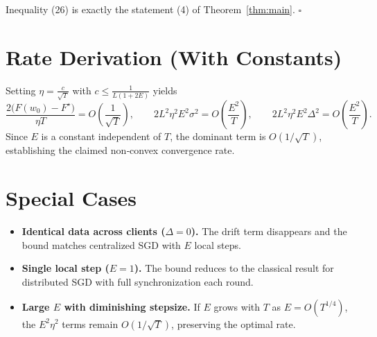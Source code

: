 \documentclass{article}
\begin{document}
Inequality (26) is exactly the statement (4) of Theorem~\ref{thm:main}.
\hfill $\square$

\section*{Rate Derivation (With Constants)}
Setting $\eta = \frac{c}{\sqrt{T}}$ with $c\le \frac{1}{L(1+2E)}$ yields
\[
\frac{2\bigl(F(w_0)-F^{\star}\bigr)}{\eta T}
= O\!\left(\frac{1}{\sqrt{T}}\right),\qquad
2L^{2}\eta^{2}E^{2}\sigma^{2}=O\!\left(\frac{E^{2}}{T}\right),\qquad
2L^{2}\eta^{2}E^{2}\Delta^{2}=O\!\left(\frac{E^{2}}{T}\right).
\]
Since $E$ is a constant independent of $T$, the dominant term is $O(1/\sqrt{T})$,
establishing the claimed non‑convex convergence rate.

\section*{Special Cases}
\begin{itemize}
\item \textbf{Identical data across clients ($\Delta=0$).} The drift term disappears and the bound matches centralized SGD with $E$ local steps.
\item \textbf{Single local step ($E=1$).} The bound reduces to the classical result for distributed SGD with full synchronization each round.
\item \textbf{Large $E$ with diminishing stepsize.} If $E$ grows with $T$ as $E=O(T^{1/4})$, the $E^{2}\eta^{2}$ terms remain $O(1/\sqrt{T})$, preserving the optimal rate.
\end{itemize}
\end{document}
